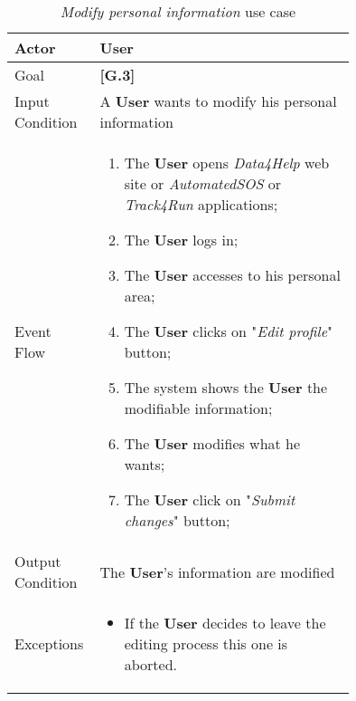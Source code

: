 \begin{center}
\begin{table}
\begin{tabular}{ | l | p{0.75\linewidth} | }
  \hline
    Actor & \textbf{User} \\ \hline
    Goal & \textbf{[G.3]} \\ \hline
    Input Condition & A \textbf{User} wants to modify his personal information\\ \hline
    Event Flow & \begin{minipage}[t]{0.7\textwidth}
      \begin{enumerate}
        \item The \textbf{User} opens \textit{Data4Help} web site or \textit{AutomatedSOS} or \textit{Track4Run} applications;
        \item The \textbf{User} logs in;
        \item The \textbf{User} accesses to his personal area;
        \item The \textbf{User} clicks on "\textit{Edit profile}" button;
        \item The system shows the \textbf{User} the modifiable information;
        \item The \textbf{User} modifies what he wants;
        \item The \textbf{User} click on "\textit{Submit changes}" button;
      \end{enumerate}
    \smallskip
  \end{minipage} \\ \hline
  Output Condition & The \textbf{User}'s information are modified\\ \hline
  Exceptions & \begin{minipage}[t]{0.7\textwidth}
    \begin{itemize}
      \smallskip
      \item If the \textbf{User} decides to leave the editing process this one is aborted.
    \end{itemize}
    \smallskip
  \end{minipage}  \\ \hline
\end{tabular}
\caption{\textit{Modify personal information} use case}
\label{table:modifyPersonalInformationTable}
\end{table}
\end{center}

